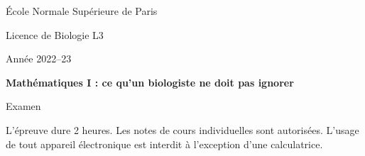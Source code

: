 \documentclass[french, 9pt]{article}
\title{}
\newcommand{\alglin}{/home/robin/ENSEIGN/Cours/MathBiologie/L3-ENS-Math1/Exercices/AlgLin}
\newcommand{\multivar}{/home/robin/ENSEIGN/Cours/MathBiologie/L3-ENS-Math1/Exercices/MultiVar}
\newcommand{\equadiff}{/home/robin/ENSEIGN/Cours/MathBiologie/L3-ENS-Math1/Exercices/EquaDiff}
\newcommand{\probas}{/home/robin/ENSEIGN/Cours/MathBiologie/L3-ENS-Math1/Exercices/Probas}
\begin{document}

\begin{centering}
  \footnotesize{\sc École Normale Supérieure de Paris} 
  
  \bigskip
  \footnotesize{\sc Licence de Biologie L3}
  
  \bigskip
  \footnotesize{\sc Année 2022–23}
  
  \bigskip
  {\bf Mathématiques I : ce qu’un biologiste ne doit pas ignorer} 
  
  \bigskip
  {\sc Examen}
  
\end{centering}

\bigskip
L'épreuve dure 2 heures. 
Les notes de cours individuelles sont autorisées.
L’usage de tout appareil électronique est interdit à l’exception d’une calculatrice.










\end{document}
